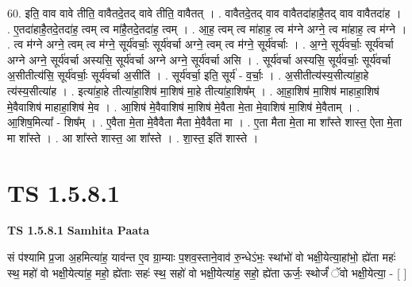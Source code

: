 \documentclass[17pt]{extarticle}
\begin{document}
60. इति॒ वाव वावे तीति॒ वावैतदे॒तद् वावे तीति॒ वावैतत् । . वावैतदे॒तद् वाव वावैतदा॑हाहै॒तद् वाव वावैतदा॑ह । . ए॒तदा॑हाहै॒तदे॒तदा॑ह॒ त्वम् त्व मा॑है॒तदे॒तदा॑ह॒ त्वम् । . आ॒ह॒ त्वम् त्व मा॑हाह॒ त्व म॑ग्ने अग्ने॒ त्व मा॑हाह॒ त्व म॑ग्ने । . त्व म॑ग्ने अग्ने॒ त्वम् त्व म॑ग्ने॒ सूर्य॑वर्चाः॒ सूर्य॑वर्चा अग्ने॒ त्वम् त्व म॑ग्ने॒ सूर्य॑वर्चाः । . अ॒ग्ने॒ सूर्य॑वर्चाः॒ सूर्य॑वर्चा अग्ने अग्ने॒ सूर्य॑वर्चा अस्यसि॒ सूर्य॑वर्चा अग्ने अग्ने॒ सूर्य॑वर्चा असि । . सूर्य॑वर्चा अस्यसि॒ सूर्य॑वर्चाः॒ सूर्य॑वर्चा अ॒सीतीत्य॑सि॒ सूर्य॑वर्चाः॒ सूर्य॑वर्चा अ॒सीति॑ । . सूर्य॑वर्चा॒ इति॒ सूर्य॑ - व॒र्चाः॒ । . अ॒सीतीत्य॑स्य॒सीत्या॑हा॒हे त्य॑स्य॒सीत्या॑ह । . इत्या॑हा॒हे तीत्या॑हा॒शिष॑ मा॒शिष॑ मा॒हे तीत्या॑हा॒शिष᳚म् । . आ॒हा॒शिष॑ मा॒शिष॑ माहाहा॒शिष॑ मे॒वैवाशिष॑ माहाहा॒शिष॑ मे॒व । . आ॒शिष॑ मे॒वैवाशिष॑ मा॒शिष॑ मे॒वैता मे॒ता मे॒वाशिष॑ मा॒शिष॑ मे॒वैताम् । . आ॒शिष॒मित्या᳚ - शिष᳚म् । . ए॒वैता मे॒ता मे॒वैवैता मैता मे॒वैवैता मा । . ए॒ता मैता मे॒ता मा शा᳚स्ते शास्त॒ ऐता मे॒ता मा शा᳚स्ते । . आ शा᳚स्ते शास्त॒ आ शा᳚स्ते । . शा॒स्त॒ इति॑ शास्ते । \newline
\pagebreak
{}

\section{ TS 1.5.8.1 }

\textbf{TS 1.5.8.1 } \newline
\textbf{Samhita Paata} \newline

सं प॑श्यामि प्र॒जा अ॒हमित्या॑ह॒ याव॑न्त ए॒व ग्रा॒म्याः प॒शव॒स्ताने॒वाव॑ रु॒न्धेऽंभः॒ स्थांभो॑ वो भक्षी॒येत्या॒हांभो॒ ह्ये॑ता महः॑ स्थ॒ महो॑ वो भक्षी॒येत्या॑ह॒ महो॒ ह्ये॑ताः सहः॑ स्थ॒ सहो॑ वो भक्षी॒येत्या॑ह॒ सहो॒ ह्ये॑ता ऊर्जः॒ स्थोर्जं॑ ॅवो भक्षी॒येत्या॒ - [ ] \newline
\end{document}
